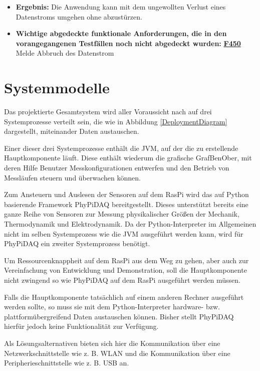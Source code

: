 \documentclass[parskip=full]{scrartcl}
\begin{document}
\begin{description}
\begin{itemize}
\item []\textbf{Ergebnis:} Die Anwendung kann mit dem ungewollten Verlust eines Datenstroms umgehen ohne abzustürzen.
\item []\textbf{Wichtige abgedeckte funktionale Anforderungen, die in den vorangegangenen Testfällen noch nicht abgedeckt wurden:} \hyperlink{link-f450}{\textbf{F450}} Melde Abbruch des Datenstrom

\end{itemize}


\end{description}

\clearpage

\section{Systemmodelle}\label{systemmodell}

Das projektierte Gesamtsystem wird aller Voraussicht nach auf drei Systemprozesse verteilt sein, die wie in Abbildung \ref{DeploymentDiagram} dargestellt, miteinander Daten austauschen.

Einer dieser drei Systemprozesse enthält die \gls{JVM}, auf der die zu erstellende Hauptkomponente läuft. Diese enthält wiederum die grafische \gls{GrafBenOber}, mit deren Hilfe Benutzer Messkonfigurationen entwerfen und den Betrieb von Messläufen steuern und überwachen können.

Zum Ansteuern und Auslesen der Sensoren auf dem \gls{RasPi} wird das auf Python basierende Framework \gls{PhyPiDAQ} bereitgestellt. Dieses unterstützt bereits eine  ganze Reihe von Sensoren zur Messung physikalischer Größen der Mechanik, Thermodynamik und Elektrodynamik. Da der Python-Interpreter im Allgemeinen nicht im selben Systemprozess wie die \gls{JVM} ausgeführt werden kann, wird für PhyPiDAQ ein zweiter Systemprozess benötigt.

Um Ressourcenknappheit auf dem \gls{RasPi} aus dem Weg zu gehen, aber auch zur Vereinfachung von Entwicklung und Demonstration, soll die Hauptkomponente nicht zwingend so wie PhyPiDAQ auf dem \gls{RasPi} ausgeführt werden müssen. 

Falls die Hauptkomponente tatsächlich auf einem anderen Rechner ausgeführt werden sollte, so muss sie mit dem Python-Interpreter hardware- bzw. plattformübergreifend Daten austauschen können. Bisher stellt PhyPiDAQ hierfür jedoch keine Funktionalität zur Verfügung. 

Als Lösungsalternativen bieten sich hier die Kommunikation über eine Netzwerkschnittstelle wie z. B. WLAN und die Kommunikation über eine Peripherieschnittstelle wie z. B. USB an.
\end{document}
